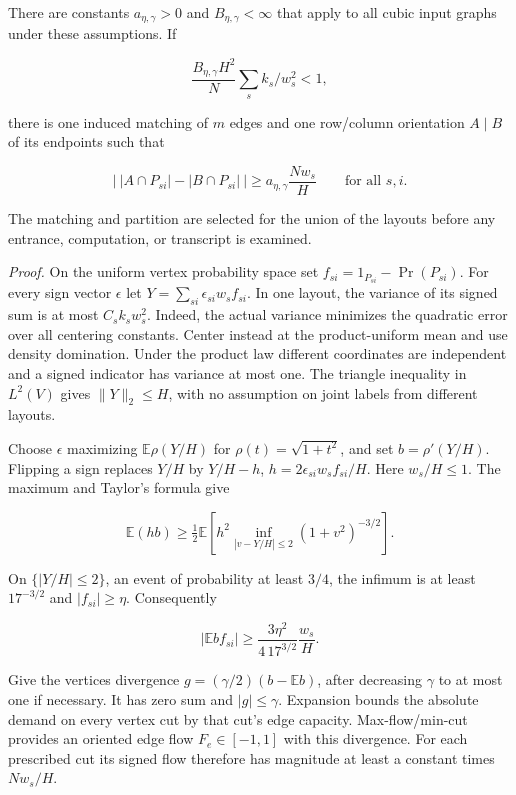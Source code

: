 \documentclass[
  11pt,
]{article}
\begin{document}
There are constants \(a_{\eta,\gamma}>0\) and \(B_{\eta,\gamma}<\infty\)
that apply to all cubic input graphs under these assumptions. If

\[
 \frac{B_{\eta,\gamma}H^2}{N}\sum_s k_s/w_s^2<1 ,
 \tag{X.2}
\]

there is one induced matching of \(m\) edges and one row/column
orientation \(A\mid B\) of its endpoints such that

\[
  \left|\ |A\cap P_{si}|-|B\cap P_{si}|\ \right|
       \ge a_{\eta,\gamma}\frac{Nw_s}{H}
       \qquad\text{for all }s,i.                         \tag{X.3}
\]

The matching and partition are selected for the union of the layouts
before any entrance, computation, or transcript is examined.

\emph{Proof.} On the uniform vertex probability space set
\(f_{si}=1_{P_{si}}-\Pr(P_{si})\). For every sign vector \(\epsilon\)
let \(Y=\sum_{si}\epsilon_{si}w_s f_{si}\). In one layout, the variance
of its signed sum is at most \(C_sk_s w_s^2\). Indeed, the actual
variance minimizes the quadratic error over all centering constants.
Center instead at the product-uniform mean and use density domination.
Under the product law different coordinates are independent and a signed
indicator has variance at most one. The triangle inequality in
\(L^2(V)\) gives \(\|Y\|_2\le H\), with no assumption on joint labels
from different layouts.

Choose \(\epsilon\) maximizing \(\mathbb E\rho(Y/H)\) for
\(\rho(t)=\sqrt{1+t^2}\), and set \(b=\rho'(Y/H)\). Flipping a sign
replaces \(Y/H\) by \(Y/H-h\), \(h=2\epsilon_{si}w_sf_{si}/H\). Here
\(w_s/H\le1\). The maximum and Taylor's formula give

\[
 \mathbb E(hb)\ge\tfrac12\mathbb E\!\left[
 h^2\inf_{|v-Y/H|\le2}(1+v^2)^{-3/2}\right].
\]

On \(\{|Y/H|\le2\}\), an event of probability at least \(3/4\), the
infimum is at least \(17^{-3/2}\) and \(|f_{si}|\ge\eta\). Consequently

\[
 |\mathbb E b f_{si}|\ge \frac{3\eta^2}{4\,17^{3/2}}\frac{w_s}{H}.
 \tag{X.4}
\]

Give the vertices divergence \(g=(\gamma/2)(b-\mathbb E b)\), after
decreasing \(\gamma\) to at most one if necessary. It has zero sum and
\(|g|\le\gamma\). Expansion bounds the absolute demand on every vertex
cut by that cut's edge capacity. Max-flow/min-cut provides an oriented
edge flow \(F_e\in[-1,1]\) with this divergence. For each prescribed cut
its signed flow therefore has magnitude at least a constant times
\(Nw_s/H\).
\end{document}
